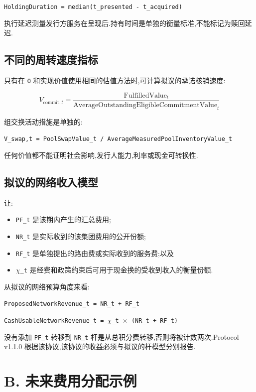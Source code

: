 \documentclass[11pt]{article}
\begin{document}
\texttt{HoldingDuration = median(t\_presented - t\_acquired)}

执行延迟测量发行方服务在呈现后.持有时间是单独的衡量标准,不能标记为赎回延迟.

\subsection*{不同的周转速度指标}

只有在 \texttt{O} 和实现价值使用相同的估值方法时,可计算拟议的承诺核销速度:

\[
V_{\mathrm{commit},t} = \frac{\mathrm{FulfilledValue}_t}{\mathrm{AverageOutstandingEligibleCommitmentValue}_t}
\]

组交换活动措施是单独的:

\texttt{V\_swap,t = PoolSwapValue\_t / AverageMeasuredPoolInventoryValue\_t}

任何价值都不能证明社会影响,发行人能力,利率或现金可转换性.

\subsection*{拟议的网络收入模型}

让:

\begin{itemize}[leftmargin=*]
\item \texttt{PF\_t} 是该期内产生的汇总费用;
\item \texttt{NR\_t} 是实际收到的该集团费用的公开份额;
\item \texttt{RF\_t} 是单独提出的路由费或实际收到的服务费;以及
\item \texttt{$\chi$\_t} 是经费和政策约束后可用于现金换的受收到收入的衡量份额.
\end{itemize}
从拟议的网络预算角度来看:

\texttt{ProposedNetworkRevenue\_t = NR\_t + RF\_t}

\texttt{CashUsableNetworkRevenue\_t = $\chi$\_t $\times$ (NR\_t + RF\_t)}

没有添加 \texttt{PF\_t} 转移到 \texttt{NR\_t} 杆是从总积分费转移,否则将被计数两次.Protocol v1.1.0 根据该协议,该协议的收益必须与拟议的杆模型分别报告.


\section*{B. 未来费用分配示例}
\end{document}
